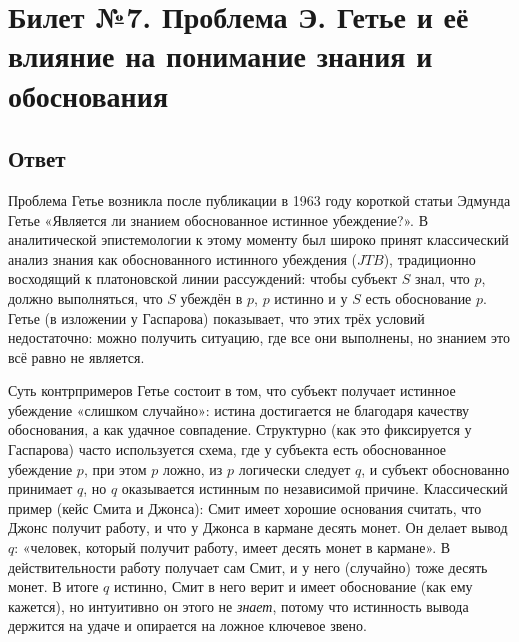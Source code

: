 \documentclass[a4paper,12pt]{article}
\begin{document}
\newpage
\section{Билет №7. Проблема Э. Гетье и её влияние на понимание знания и обоснования}

\subsection{Ответ}

Проблема Гетье возникла после публикации в 1963 году короткой статьи Эдмунда Гетье «Является ли знанием обоснованное истинное убеждение?». В аналитической эпистемологии к этому моменту был широко принят классический анализ знания как обоснованного истинного убеждения ($JTB$), традиционно восходящий к платоновской линии рассуждений: чтобы субъект $S$ знал, что $p$, должно выполняться, что $S$ убеждён в $p$, $p$ истинно и у $S$ есть обоснование $p$. Гетье (в изложении у Гаспарова) показывает, что этих трёх условий недостаточно: можно получить ситуацию, где все они выполнены, но знанием это всё равно не является.

Суть контрпримеров Гетье состоит в том, что субъект получает истинное убеждение «слишком случайно»: истина достигается не благодаря качеству обоснования, а как удачное совпадение. Структурно (как это фиксируется у Гаспарова) часто используется схема, где у субъекта есть обоснованное убеждение $p$, при этом $p$ ложно, из $p$ логически следует $q$, и субъект обоснованно принимает $q$, но $q$ оказывается истинным по независимой причине. Классический пример (кейс Смита и Джонса): Смит имеет хорошие основания считать, что Джонс получит работу, и что у Джонса в кармане десять монет. Он делает вывод $q$: «человек, который получит работу, имеет десять монет в кармане». В действительности работу получает сам Смит, и у него (случайно) тоже десять монет. В итоге $q$ истинно, Смит в него верит и имеет обоснование (как ему кажется), но интуитивно он этого не \emph{знает}, потому что истинность вывода держится на удаче и опирается на ложное ключевое звено.
\end{document}
